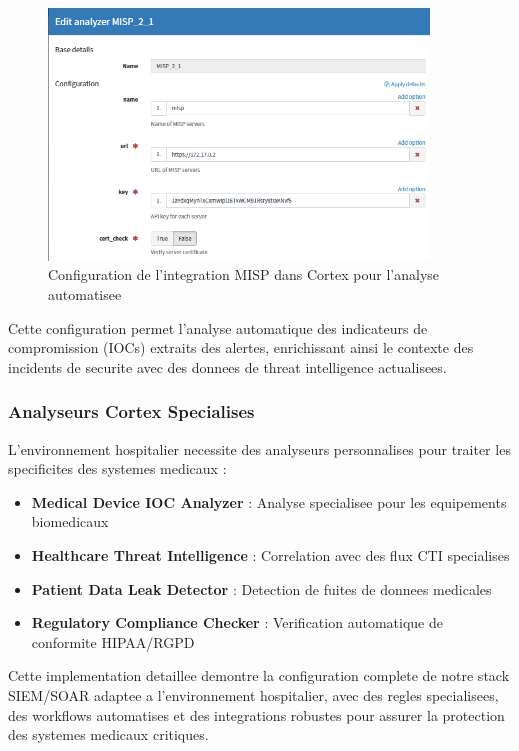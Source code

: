 \begin{figure}[H]
    \centering
    \includegraphics[width=0.9\textwidth]{images/misp_config_in_cortex.png}
    \caption{Configuration de l'integration MISP dans Cortex pour l'analyse automatisee}
    \label{fig:misp_cortex_config}
\end{figure}

Cette configuration permet l'analyse automatique des indicateurs de compromission (IOCs) extraits des alertes, enrichissant ainsi le contexte des incidents de securite avec des donnees de threat intelligence actualisees.

\subsubsection{Analyseurs Cortex Specialises}

L'environnement hospitalier necessite des analyseurs personnalises pour traiter les specificites des systemes medicaux :

\begin{itemize}
    \item \textbf{Medical Device IOC Analyzer} : Analyse specialisee pour les equipements biomedicaux
    \item \textbf{Healthcare Threat Intelligence} : Correlation avec des flux CTI specialises
    \item \textbf{Patient Data Leak Detector} : Detection de fuites de donnees medicales
    \item \textbf{Regulatory Compliance Checker} : Verification automatique de conformite HIPAA/RGPD
\end{itemize}

Cette implementation detaillee demontre la configuration complete de notre stack SIEM/SOAR adaptee a l'environnement hospitalier, avec des regles specialisees, des workflows automatises et des integrations robustes pour assurer la protection des systemes medicaux critiques.
